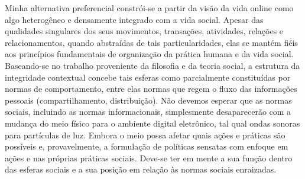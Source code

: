 Minha alternativa preferencial constrói-se a partir da visão da vida
online como algo heterogêneo e densamente integrado com a vida social.
Apesar das qualidades singulares dos seus movimentos, transações,
atividades, relações e relacionamentos, quando abstraídas de tais
particularidades, elas se mantém fiéis aos princípios fundamentais de
organização da prática humana e da vida social. Baseando-se no trabalho
proveniente da filosofia e da teoria social, a estrutura da integridade
contextual concebe tais esferas como parcialmente constituídas por
normas de comportamento, entre elas normas que regem o fluxo das
informações pessoais (compartilhamento, distribuição). Não devemos
esperar que as normas sociais, incluindo as normas informacionais,
simplesmente desaparecerão com a mudança do meio físico para o ambiente
digital eletrônico, tal qual ondas sonoras para partículas de luz.
Embora o meio possa afetar quais ações e práticas são possíveis e,
provavelmente, a formulação de políticas sensatas com enfoque em ações e
nas próprias práticas sociais. Deve-se ter em mente a sua função dentro
das esferas sociais e a sua posição em relação às normas sociais
enraizadas.

